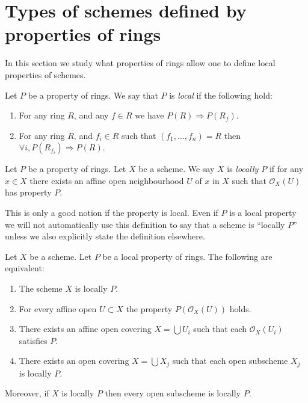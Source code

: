 













\section{Types of schemes defined by properties of rings}
\label{section-properties-rings}

\noindent
In this section we study what properties of rings
allow one to define local properties of schemes.

\begin{definition}
\label{definition-property-local}
Let $P$ be a property of rings.
We say that $P$ is {\it local} if the following hold:
\begin{enumerate}
\item For any ring $R$, and any $f \in R$ we have
$P(R) \Rightarrow P(R_f)$.
\item For any ring $R$, and $f_i \in R$ such that
$(f_1, \ldots, f_n) = R$ then
$\forall i, P(R_{f_i}) \Rightarrow P(R)$.
\end{enumerate}
\end{definition}

\begin{definition}
\label{definition-locally-P}
Let $P$ be a property of rings. Let $X$ be a scheme.
We say $X$ is {\it locally $P$} if for any $x \in X$
there exists an affine open neighbourhood $U$ of $x$
in $X$ such that $\mathcal{O}_X(U)$ has property $P$.
\end{definition}

\noindent
This is only a good notion if the property is local.
Even if $P$ is a local property we will not
automatically use this definition to say that a scheme is
``locally $P$'' unless we also explicitly state the definition
elsewhere.

\begin{lemma}
\label{lemma-locally-P}
Let $X$ be a scheme. Let $P$ be a local property of rings.
The following are equivalent:
\begin{enumerate}
\item The scheme $X$ is locally $P$.
\item For every affine open $U \subset X$ the property
$P(\mathcal{O}_X(U))$ holds.
\item There exists an affine open covering $X = \bigcup U_i$ such that
each $\mathcal{O}_X(U_i)$ satisfies $P$.
\item There exists an open covering $X = \bigcup X_j$
such that each open subscheme $X_j$ is locally $P$.
\end{enumerate}
Moreover, if $X$ is locally $P$ then every open subscheme
is locally $P$.
\end{lemma}

